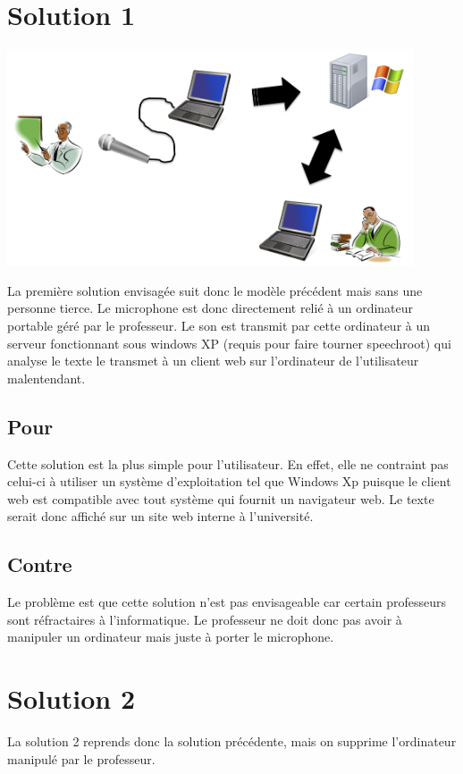 \section{Solution 1}

\includegraphics[width=12cm]{img/solution1.png} 

La première solution envisagée suit donc le modèle précédent mais sans une personne tierce. Le microphone est donc directement relié à un ordinateur portable géré par le professeur. Le son est transmit par cette ordinateur à un serveur fonctionnant sous windows XP (requis pour faire tourner speechroot) qui analyse le texte le transmet à un client web sur l'ordinateur de l'utilisateur malentendant.

\subsection{Pour}
Cette solution est la plus simple pour l'utilisateur. En effet, elle ne contraint pas celui-ci à utiliser un système d'exploitation tel que Windows Xp puisque le client web est compatible avec tout système qui fournit un navigateur web. Le texte serait donc affiché sur un site web interne à l'université.

\subsection{Contre}
Le problème est que cette solution n'est pas envisageable car certain professeurs sont réfractaires à l'informatique. Le professeur ne doit donc pas avoir à manipuler un ordinateur mais juste à porter le microphone.


\section{Solution 2}

La solution 2 reprends donc la solution précédente, mais on supprime l'ordinateur manipulé par le professeur.

